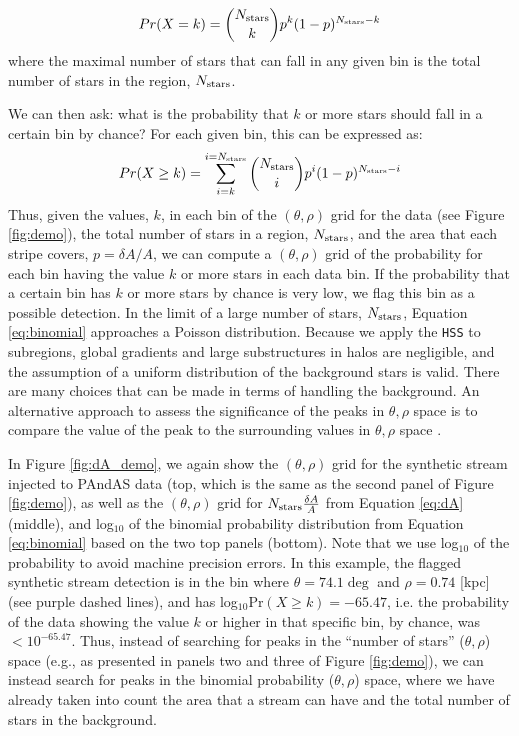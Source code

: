 \documentclass[twocolumn]{aastex631}
\begin{document}
\begin{equation}
\begin{aligned}
    Pr (X = k) = \binom{N_{\rm stars}}{k} p^k (1-p)^{N_{\rm stars}-k}
\end{aligned}
\end{equation}
where the maximal number of stars that can fall in any given bin is the total number of stars in the region, $N_{\rm stars}$. 

We can then ask: what is the probability that $k$ or more stars should fall in a certain bin by chance? For each given bin,  this can be expressed as:
\begin{equation}
\begin{aligned}\label{eq:binomial}
    Pr (X \geq k) = \sum_{i = k}^{i = N_{\rm stars} }\binom{N_{\rm stars}}{i} p^i (1-p)^{N_{\rm stars}-i}
\end{aligned}
\end{equation}
Thus, given the values, $k$, in each bin of the $(\theta,\rho)$ grid for the data (see Figure \ref{fig:demo}), the total number of stars in a region, $N_{\rm stars}$, and the area that each stripe covers, $p = \delta A/A$, we can compute a $(\theta,\rho)$ grid of the probability for each bin having the value $k$ or more stars in each data bin. If the probability that a certain bin has $k$ or more stars by chance is very low, we flag this bin as a possible detection. In the limit of a large number of stars, $N_{\rm stars}$, Equation \ref{eq:binomial} approaches a Poisson distribution. Because we apply the \texttt{HSS} to subregions, global gradients and large substructures in halos are negligible, and the assumption of a uniform distribution of the background stars is valid. There are many choices that can be made in terms of handling the background. An alternative approach to assess the significance of the peaks in $\theta,\rho$ space is to compare the value of the peak to the surrounding values in $\theta,\rho$ space \citep[see, e.g., Figure 7 in][]{shih21}.

In Figure \ref{fig:dA_demo}, we again show the $(\theta,\rho)$ grid for the synthetic stream injected to PAndAS data (top, which is the same as the second panel of Figure \ref{fig:demo}), as well as the $(\theta,\rho)$ grid for $N_{\rm stars} \frac{\delta A}{A}$ from Equation \ref{eq:dA} (middle), and log$_{10}$ of the binomial probability distribution from Equation \ref{eq:binomial} based on the two top panels (bottom). Note that we use log$_{10}$ of the probability to avoid machine precision errors. In this example, the flagged synthetic stream detection is in the bin where $\theta = 74.1\deg$ and $\rho = 0.74$ [kpc] (see purple dashed lines), and has log$_{10}$Pr$( X \geq k) =  -65.47$, i.e. the probability of the data showing the value $k$ or higher in that specific bin, by chance, was  $<  10^{-65.47}$. Thus, instead of searching for peaks in the ``number of stars'' ($\theta,\rho$) space (e.g., as presented in panels two and three of Figure \ref{fig:demo}), we can instead search for peaks in the binomial probability ($\theta,\rho$) space, where we have already taken into count the area that a stream can have and the total number of stars in the background.
\end{document}
